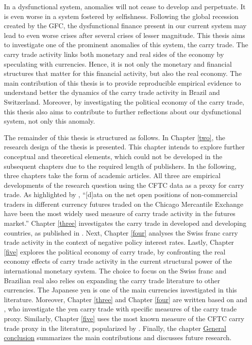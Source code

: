 \documentclass[a4paper, twoside]{templates/ociamthesis}
\begin{document}
In a dysfunctional system, anomalies will not cease to develop and perpetuate. It is even worse in a system fostered by selfishness. Following the global recession created by the GFC, the dysfunctional finance present in our current system may lead to even worse crises after several crises of lesser magnitude. This thesis aims to investigate one of the prominent anomalies of this system, the carry trade. The carry trade activity links both monetary and real sides of the economy by speculating with currencies. Hence, it is not only the monetary and financial structures that matter for this financial activity, but also the real economy. The main contribution of this thesis is to provide reproducible empirical evidence to understand better the dynamics of the carry trade activity in Brazil and Switzerland. Moreover, by investigating the political economy of the carry trade, this thesis also aims to contribute to further reflections about our dysfunctional system, not only this anomaly.

The remainder of this thesis is structured as follows. In Chapter \ref{two}, the research design of the thesis is presented. This chapter intends to explore further conceptual and theoretical elements, which could not be developed in the subsequent chapters due to the required length of publishers. In the following, three chapters take the form of academic articles. All three are empirical developments of the research question using the CFTC data as a proxy for carry trade. As highlighted by \textcite[ 38]{galati2007}, ``{[}d{]}ata on the net open positions of non-commercial traders in different currency futures traded on the Chicago Mercantile Exchange have been the most widely used measure of carry trade activity in the futures market.'' Chapter \ref{three} investigates the carry trade in developed and developing countries, as published in \textcite{tomio2020}. Next, Chapter \ref{four} analyses the Swiss franc carry trade activity in the context of negative policy interest rates. Lastly, Chapter \ref{five} explores the political economy of carry trade, by confronting the real economy effects of carry trade activity in the current structural power of the international monetary system. The choice to focus on the Swiss franc and Brazilian real also relies on expanding the carry trade literature to other currencies. The Japanese yen is one of the main currencies investigated in this literature. Moreover, Chapter \ref{three} and Chapter \ref{four} are written based on \textcite{nishigaki2007} and \textcite{fong2013}, who investigate the yen carry trade with specific measures of the carry trade proxy. Similarly, Chapter \ref{five} uses the most known measure of the CFTC carry trade proxy in the literature, popularized by \textcite{brunnermeier2008}. Finally, the chapter \protect\hyperlink{general-conclusion}{General conclusion} summarizes the main contributions and discusses future research.
\end{document}

